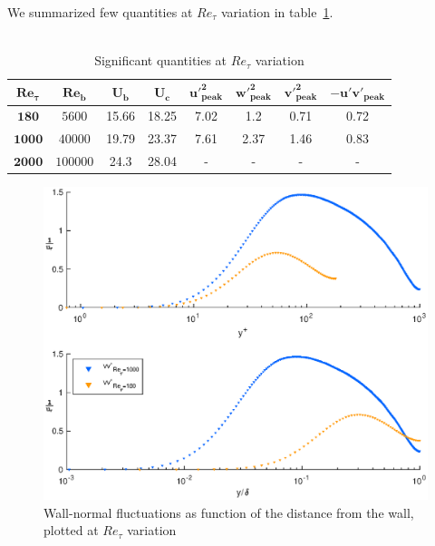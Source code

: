We summarized few quantities at $Re_{\tau}$ variation in table~\ref{quantities:Re}.\\~\par

\begin{table}[h]
\caption{Significant quantities at $Re_{\tau}$ variation}
\begin{center}
\begin{tabular}{cccccccc}
\toprule
$\mathbf{Re_{\tau}}$ & $\mathbf{Re_{b}}$ & $\mathbf{U_{b}}$ & $\mathbf{U_{c}}$ & $\mathbf{u'^{2}_{peak}}$ & $\mathbf{w'^{2}_{peak}}$ & $\mathbf{v'^{2}_{peak}}$ & $\mathbf{-u'v'_{peak}}$\\
\hline
$\mathbf{180}$ & $5600$ & 15.66 & 18.25 & 7.02 & 1.2 & 0.71 & 0.72 \\
$\mathbf{1000}$ & $40000$ & 19.79 & 23.37 & 7.61 & 2.37 & 1.46 & 0.83 \\
$\mathbf{2000}$ & $100000$ & 24.3 & 28.04 & - & - & - &  -\\
\bottomrule
\end{tabular}
\end{center}
\label{quantities:Re}
\end{table}

\begin{figure}
\begin{center}
\includegraphics[scale=0.55]{grafici/vv_comparison}
\caption{Wall-normal fluctuations as function of the distance from the wall, plotted at $Re_{\tau}$ variation}
\label{vv:comparison}
\end{center}
\end{figure}

